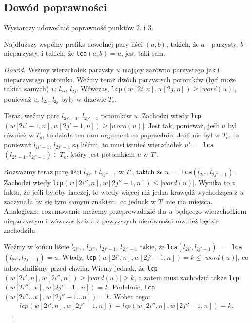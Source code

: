 \subsection{Dowód poprawności}
Wystarczy udowodnić poprawność punktów $2.$ i $3.$
\begin{theorem}{}{}
Najdłuższy wspólny prefiks dowolnej pary liści $(a,b)$, takich, że $a$ - parzysty, $b$ - nieparzysty, i takich, że \verb|lca|$(a,b) = u$, jest taki sam.
\end{theorem}
\begin{proof}[Dowód]
Weźmy wierzchołek parzysty $u$ mający zarówno parzystego jak i nieparzystego potomka. Weźmy teraz dwóch parzystych potomków (być może takich samych) $u$: $l_{2i},\,l_{2j}$. Wówczas, \verb|lcp|$(w[2i,n],w[2j,n]) \geq |word(u)|$, ponieważ $u$, $l_{2i}$, $l_{2j}$ były w drzewie $T_e$.


Teraz, weźmy parę $l_{2i'-1}$, $l_{2j'-1}$ potomków $u$. Zachodzi wtedy \verb|lcp|$(w[2i'-1,n],w[2j'-1,n]) \geq |word(u)|$. Jest tak, ponieważ, jeśli $u$ był również w $T_o$, to działa ten sam argument co poprzednio. Jeśli nie był w $T_o$, to ponieważ $l_{2i'-1}$, $l_{2j'-1}$ są liśćmi, to musi istnieć wierzchołek $u' = $\verb| lca|$(l_{2i'-1}, l_{2j'-1}) \in T_o$, który jest potomkiem $u$ w $T'$. 


Rozważmy teraz parę liści $l_{2i''}$ i $l_{2j''-1}$ w $T'$, takich że $u = $\verb| lca|$(l_{2i''}, l_{2j''-1})$. Zachodzi wtedy \verb|lcp|$(w[2i'',n], w[2j''-1, n]) \leq |word(u)|$. Wynika to z faktu, że jeśli byłoby inaczej, to wtedy więcej niż jedna krawędź wychodząca z $u$ zaczynała by się tym samym znakiem, co jednak w $T'$ nie ma miejsca. Analogiczne rozumowanie możemy przeprowaddzić dla $u$ będącego wierzchołkiem nieparzystym i wówczas każda z powyższych nierówności również będzie zachodziła.

Weźmy w końcu liście $l_{2i'},$, $l_{2i''}$, $l_{2j'-1}$, $l_{2j''-1}$ takie, że \verb|lca|$(l_{2i'}, l_{2j'-1}) = $ \verb| lca|$(l_{2i''}, l_{2j''-1}) = u$. Wtedy, \verb|lcp|$(w[2i',n], w[2j'-1,n]) = k \leq |word(u)|$, co udowodniliśmy przed chwilą. Wiemy jednak, że \verb|lcp|$(w[2i',n], w[2i'',n]) \geq |word(u)| \geq k$, a zatem musi zachodzić także \verb|lcp|$(w[2i'' \ldots n], w[2j'-1 \ldots n]) = k$. Podobnie, \verb|lcp|$(w[2i'' \ldots n], w[2j''-1 \ldots n]) = k$. Wobec tego:
\begin{align*}
    lcp(w[2i',n],w[2j'-1,n]) = lcp(w[2i'',n], w[2j''-1,n]) = k.
\end{align*}
\end{proof}

